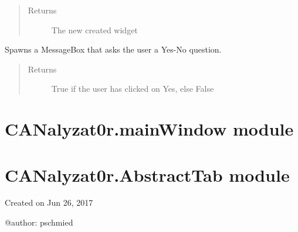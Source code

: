 \documentclass[letterpaper,10pt,english]{sphinxmanual}
\begin{document}
\begin{fulllineitems}
\begin{fulllineitems}
\begin{quote}
\begin{description}
\item[{Returns}] \leavevmode
The new created widget

\end{description}\end{quote}

\end{fulllineitems}


\begin{fulllineitems}
\label{\detokenize{src:src.Toolbox.Toolbox.yesNoBox}}
Spawns a MessageBox that asks the user a Yes-No question.
\begin{quote}\begin{description}
\item[{Returns}] \leavevmode
True if the user has clicked on Yes, else False

\end{description}\end{quote}

\end{fulllineitems}


\end{fulllineitems}



\section{CANalyzat0r.mainWindow module}
\label{\detokenize{src:module-src.mainWindow}}\label{\detokenize{src:canalyzat0r-mainwindow-module}}

\section{CANalyzat0r.AbstractTab module}
\label{\detokenize{src:module-src.AbstractTab}}\label{\detokenize{src:canalyzat0r-abstracttab-module}}
Created on Jun 26, 2017

@author: pschmied
\end{document}
